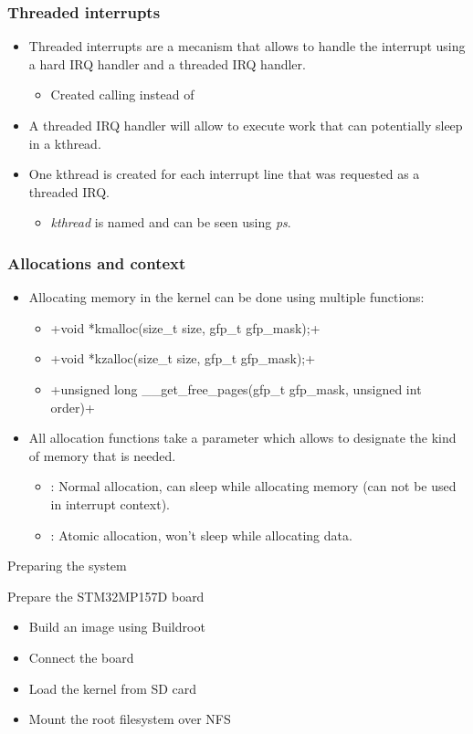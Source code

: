 \begin{frame}
  \frametitle{Threaded interrupts}
  \begin{itemize}
    \item Threaded interrupts are a mecanism that allows to handle the interrupt
          using a hard IRQ handler and a threaded IRQ handler.
      \begin{itemize}
        \item Created calling  instead of 
      \end{itemize}
    \item A threaded IRQ handler will allow to execute work that can potentially
          sleep in a kthread.
    \item One kthread is created for each interrupt line that was requested as
          a threaded IRQ.
    \begin{itemize}
      \item {\em kthread} is named  and can be seen using {\em ps}.
    \end{itemize}
  \end{itemize}
\end{frame}

\begin{frame}
  \frametitle{Allocations and context}
  \begin{itemize}
    \item Allocating memory in the kernel can be done using multiple functions:
    \begin{itemize}
      \item {}+void *kmalloc(size_t size, gfp_t gfp_mask);+
      \item {}+void *kzalloc(size_t size, gfp_t gfp_mask);+
      \item {}+unsigned long __get_free_pages(gfp_t gfp_mask, unsigned int order)+
    \end{itemize}
    \item All allocation functions take a  parameter which allows to
          designate the kind of memory that is needed.
    \begin{itemize}
      \item {}: Normal allocation, can sleep while allocating
            memory (can not be used in interrupt context).
      \item {}: Atomic allocation, won't sleep while allocating
            data.
    \end{itemize}
  \end{itemize}
\end{frame}

\setuplabframe
{Preparing the system}
{
  Prepare the STM32MP157D board
  \begin{itemize}
    \item Build an image using Buildroot
    \item Connect the board
    \item Load the kernel from SD card
    \item Mount the root filesystem over NFS
  \end{itemize}
}
